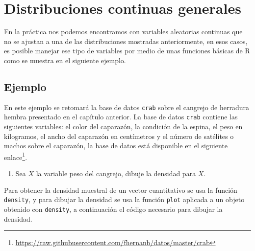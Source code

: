 \documentclass[10pt,]{krantz}
\makeatletter
\newenvironment{Shaded}{\begin{snugshade}}{\end{snugshade}}
\newcommand{\KeywordTok}[1]{\textcolor[rgb]{0.13,0.29,0.53}{\textbf{{#1}}}}
\newcommand{\DataTypeTok}[1]{\textcolor[rgb]{0.13,0.29,0.53}{{#1}}}
\newcommand{\DecValTok}[1]{\textcolor[rgb]{0.00,0.00,0.81}{{#1}}}
\newcommand{\StringTok}[1]{\textcolor[rgb]{0.31,0.60,0.02}{{#1}}}
\newcommand{\NormalTok}[1]{{#1}}
\providecommand{\tightlist}{%
  \setlength{\itemsep}{0pt}\setlength{\parskip}{0pt}}
\let\proglang=\textsf
\renewcommand{\href}[2]{#2\footnote{\url{#1}}}
\newenvironment{kframe}{%
\medskip{}
\setlength{\fboxsep}{.8em}
 \def\at@end@of@kframe{}%
 \ifinner\ifhmode%
  \def\at@end@of@kframe{\end{minipage}}%
  \begin{minipage}{\columnwidth}%
 \fi\fi%
 \def\FrameCommand##1{\hskip\@totalleftmargin \hskip-\fboxsep
 \colorbox{shadecolor}{##1}\hskip-\fboxsep
     \hskip-\linewidth \hskip-\@totalleftmargin \hskip\columnwidth}%
 \MakeFramed {\advance\hsize-\width
   \@totalleftmargin\z@ \linewidth\hsize
   \@setminipage}}%
 {\par\unskip\endMakeFramed%
 \at@end@of@kframe}
\renewenvironment{Shaded}{\begin{kframe}}{\end{kframe}}
\makeatother
\begin{document}
\section{Distribuciones continuas
generales}\label{distribuciones-continuas-generales}

En la práctica nos podemos encontramos con variables aleatorias
continuas que no se ajustan a una de las distribuciones mostradas
anteriormente, en esos casos, es posible manejar ese tipo de variables
por medio de unas funciones básicas de \proglang{R} como se muestra en
el siguiente ejemplo.

\subsection*{Ejemplo}\label{ejemplo-48}


En este ejemplo se retomará la base de datos \texttt{crab} sobre el
cangrejo de herradura hembra presentado en el capítulo anterior. La base
de datos \texttt{crab} contiene las siguientes variables: el color del
caparazón, la condición de la espina, el peso en kilogramos, el ancho
del caparazón en centímetros y el número de satélites o machos sobre el
caparazón, la base de datos está disponible en el siguiente
\href{https://raw.githubusercontent.com/fhernanb/datos/master/crab}{enlace}.

\begin{enumerate}
\def\labelenumi{\arabic{enumi})}
\tightlist
\item
  Sea \(X\) la variable peso del cangrejo, dibuje la densidad para
  \(X\).
\end{enumerate}

Para obtener la densidad muestral de un vector cuantitativo se usa la
función \texttt{density}, y para dibujar la densidad se usa la función
\texttt{plot} aplicada a un objeto obtenido con \texttt{density}, a
continuación el código necesario para dibujar la densidad.

\begin{Shaded}
\end{Shaded}
\end{document}

